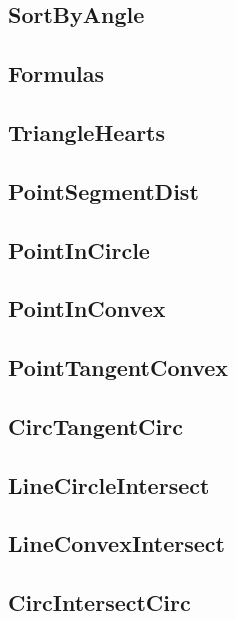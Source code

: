 	\subsection{SortByAngle}
	
	\subsection{Formulas}
	
	\subsection{TriangleHearts}
	
	\subsection{PointSegmentDist}
	
	\subsection{PointInCircle}
	
	\subsection{PointInConvex}
	
	\subsection{PointTangentConvex}
	
	\subsection{CircTangentCirc}
	
	\subsection{LineCircleIntersect}
	
	\subsection{LineConvexIntersect}
	
	\subsection{CircIntersectCirc}
	
